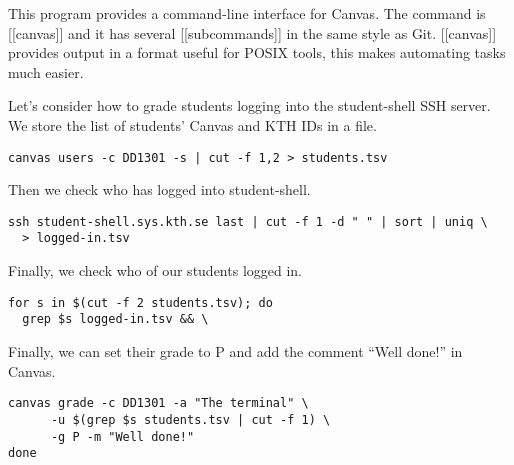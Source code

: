 
This program provides a command-line interface for Canvas.
The command is [[canvas]] and it has several [[subcommands]] in the same style 
as Git.
[[canvas]] provides output in a format useful for POSIX tools, this makes 
automating tasks much easier.

Let's consider how to grade students logging into the student-shell SSH server.
We store the list of students' Canvas and KTH IDs in a file.
\begin{lstlisting}
canvas users -c DD1301 -s | cut -f 1,2 > students.tsv
\end{lstlisting}
Then we check who has logged into student-shell.
\begin{lstlisting}[firstnumber=2]
ssh student-shell.sys.kth.se last | cut -f 1 -d " " | sort | uniq \
  > logged-in.tsv
\end{lstlisting}
Finally, we check who of our students logged in.
\begin{lstlisting}[firstnumber=4]
for s in $(cut -f 2 students.tsv); do
  grep $s logged-in.tsv && \
\end{lstlisting}
Finally, we can set their grade to P and add the comment \enquote{Well done!} 
in Canvas.
\begin{lstlisting}[firstnumber=6]
    canvas grade -c DD1301 -a "The terminal" \
      -u $(grep $s students.tsv | cut -f 1) \
      -g P -m "Well done!"
done
\end{lstlisting}

